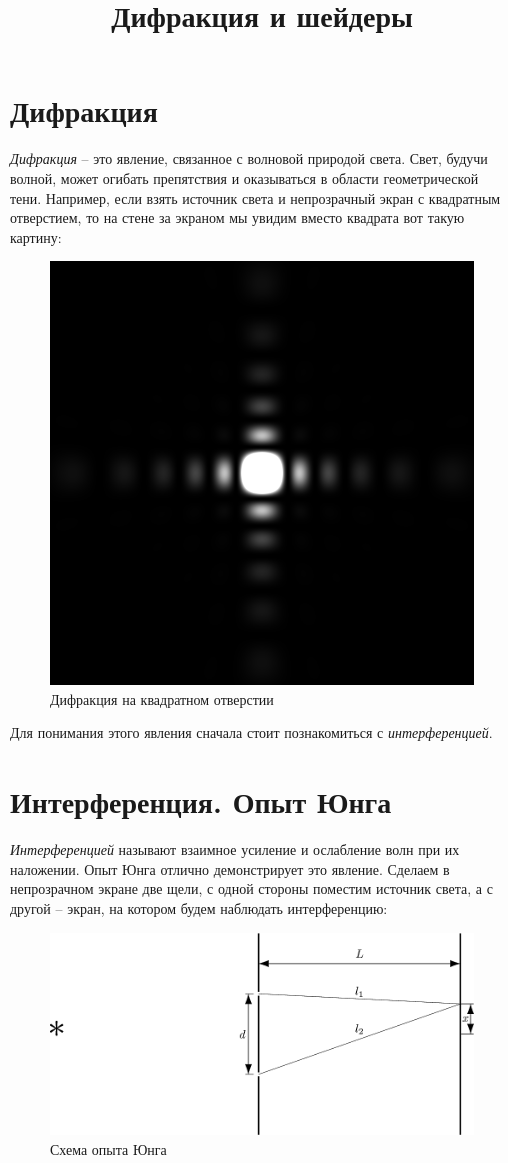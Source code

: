 

\title{Дифракция и шейдеры}


\maketitle
\tableofcontents

\section{Дифракция}

\textit{Дифракция} -- это явление, связанное с волновой природой света. Свет, будучи
волной, может огибать препятствия и оказываться в области геометрической тени.
Например, если взять источник света и непрозрачный экран с квадратным
отверстием, то на стене за экраном мы увидим вместо квадрата вот такую картину:
\begin{figure}[h!]
\center
\includegraphics[width=.35\textwidth]{2015-10-12-difraction-square.png}
\caption{Дифракция на квадратном отверстии}
\end{figure}

Для понимания этого явления сначала стоит познакомиться с \textit{интерференцией}.

\section{Интерференция. Опыт Юнга}
\textit{Интерференцией} называют взаимное усиление и ослабление волн при их наложении. Опыт Юнга отлично демонстрирует это
явление.
Сделаем в непрозрачном экране две щели, с одной стороны поместим источник света, а с другой -- экран, на котором будем наблюдать интерференцию:
\begin{figure}[h]
\center
\includegraphics[width=\textwidth]{2015-10-12-difraction-exp.png}
\caption{Схема опыта Юнга}
\end{figure}

